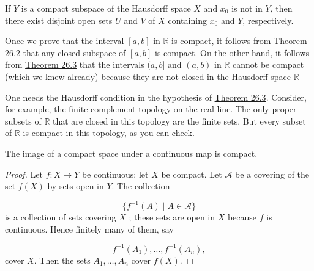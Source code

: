 \begin{lemma}
\label{lem:\thetheorem}
 If \(Y\) is a compact subspace of the Hausdorff space \(X\) and \(x_{0}\) is not in \(Y\), then there exist disjoint open sets \(U\) and \(V\) of \(X\) containing \(x_{0}\) and \(Y\), respectively.
\end{lemma}

\begin{centeredblock}
\begin{example}
\label{ex:\thesection.\theexample}
 Once we prove that the interval \([ {a,b}]\) in \(\mathbb{R}\) is compact, it follows from \hyperref[thm:26.2]{Theorem 26.2} that any closed subspace of \([ {a,b}]\) is compact. On the other hand, it follows from \hyperref[thm:26.3]{Theorem 26.3} that the intervals \((a,b\rbrack\) and \((a, b)\) in \(\mathbb{R}\) cannot be compact (which we knew already) because they are not closed in the Hausdorff space \(\mathbb{R}\)
\end{example}
\end{centeredblock}

\begin{centeredblock}
\begin{example}
\label{ex:\thesection.\theexample}
 One needs the Hausdorff condition in the hypothesis of \hyperref[thm:26.3]{Theorem 26.3}. Consider, for example, the finite complement topology on the real line. The only proper subsets of \(\mathbb{R}\) that are closed in this topology are the finite sets. But every subset of \(\mathbb{R}\) is compact in this topology, as you can check.
\end{example}
\end{centeredblock}

\begin{theorem}
\label{thm:\thetheorem}
 The image of a compact space under a continuous map is compact.

\end{theorem}
\begin{proof}
Let \(f : X \rightarrow Y\) be continuous; let \(X\) be compact. Let \(\mathcal{A}\) be a covering of the set \(f( X)\) by sets open in \(Y\). The collection

\[
\{ {f^{-1}( A) \mid A \in \mathcal{A}}\}
\]
is a collection of sets covering \(X\) ; these sets are open in \(X\) because \(f\) is continuous. Hence finitely many of them, say

\[
f^{-1}( A_{1}),\ldots ,f^{-1}( A_{n}),
\]
cover \(X\). Then the sets \(A_{1},\ldots ,A_{n}\) cover \(f( X)\).
\end{proof}

